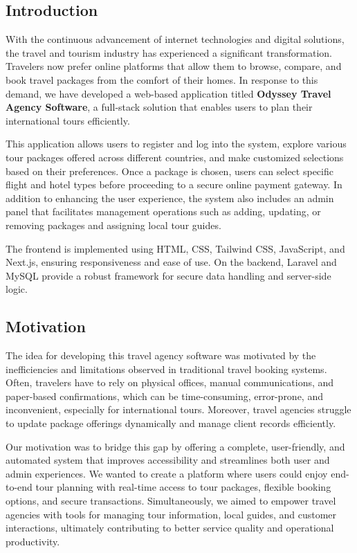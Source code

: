 \subsection{Introduction}
With the continuous advancement of internet technologies and digital solutions, the travel and tourism industry has experienced a significant transformation. Travelers now prefer online platforms that allow them to browse, compare, and book travel packages from the comfort of their homes. In response to this demand, we have developed a web-based application titled \textbf{Odyssey Travel Agency Software}, a full-stack solution that enables users to plan their international tours efficiently. 

This application allows users to register and log into the system, explore various tour packages offered across different countries, and make customized selections based on their preferences. Once a package is chosen, users can select specific flight and hotel types before proceeding to a secure online payment gateway. In addition to enhancing the user experience, the system also includes an admin panel that facilitates management operations such as adding, updating, or removing packages and assigning local tour guides. 

The frontend is implemented using HTML, CSS, Tailwind CSS, JavaScript, and Next.js, ensuring responsiveness and ease of use. On the backend, Laravel and MySQL provide a robust framework for secure data handling and server-side logic.

\subsection{Motivation}
The idea for developing this travel agency software was motivated by the inefficiencies and limitations observed in traditional travel booking systems. Often, travelers have to rely on physical offices, manual communications, and paper-based confirmations, which can be time-consuming, error-prone, and inconvenient, especially for international tours. Moreover, travel agencies struggle to update package offerings dynamically and manage client records efficiently.

Our motivation was to bridge this gap by offering a complete, user-friendly, and automated system that improves accessibility and streamlines both user and admin experiences. We wanted to create a platform where users could enjoy end-to-end tour planning with real-time access to tour packages, flexible booking options, and secure transactions. Simultaneously, we aimed to empower travel agencies with tools for managing tour information, local guides, and customer interactions, ultimately contributing to better service quality and operational productivity.


